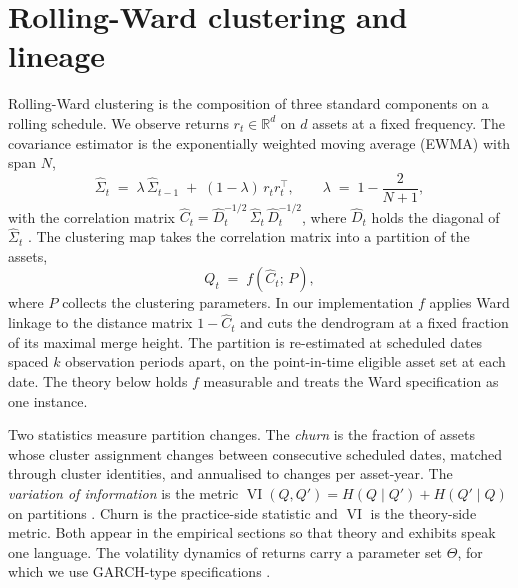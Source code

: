 \documentclass{rQUF2e}
\theoremstyle{plain}
\theoremstyle{remark}
\newcommand{\R}{\mathbb{R}}
\newcommand{\VI}{\operatorname{VI}}
\begin{document}
\section{Rolling-Ward clustering and lineage}
\label{sec:rollingward}

Rolling-Ward clustering is the composition of three standard components on a
rolling schedule. We observe returns $r_t \in \R^d$ on $d$ assets at a fixed
frequency. The covariance estimator is the exponentially weighted moving
average (EWMA) with span $N$,
\begin{equation}
\widehat{\Sigma}_t \;=\; \lambda\, \widehat{\Sigma}_{t-1}
\;+\; (1-\lambda)\, r_t r_t^{\top},
\qquad \lambda \;=\; 1 - \frac{2}{N+1},
\label{eq:ewma}
\end{equation}
with the correlation matrix
$\widehat{C}_t = \widehat{D}_t^{-1/2}\, \widehat{\Sigma}_t\, \widehat{D}_t^{-1/2}$,
where $\widehat{D}_t$ holds the diagonal of $\widehat{\Sigma}_t$
\citep{riskmetrics1996}. The clustering map takes the correlation matrix into a
partition of the assets,
\begin{equation}
Q_t \;=\; f\!\left(\widehat{C}_t;\, P\right),
\label{eq:clustermap}
\end{equation}
where $P$ collects the clustering parameters. In our implementation $f$ applies
Ward linkage \citep{ward1963hierarchical} to the distance matrix
$1-\widehat{C}_t$ and cuts the dendrogram at a fixed fraction of its maximal
merge height. The partition is re-estimated at scheduled dates spaced $k$
observation periods apart, on the point-in-time eligible asset set at each
date. The theory below holds $f$ measurable and treats the Ward specification
as one instance.

Two statistics measure partition changes. The \emph{churn} is the fraction of
assets whose cluster assignment changes between consecutive scheduled dates,
matched through cluster identities, and annualised to changes per asset-year.
The \emph{variation of information} is the metric
$\VI(Q, Q') = H(Q \mid Q') + H(Q' \mid Q)$ on partitions
\citep{meila2007comparing}. Churn is the practice-side statistic and $\VI$ is
the theory-side metric. Both appear in the empirical sections so that theory
and exhibits speak one language. The volatility dynamics of returns carry a
parameter set $\Theta$, for which we use GARCH-type specifications
\citep{bollerslev1986generalized}.
\end{document}
